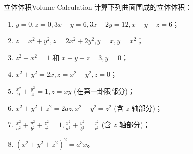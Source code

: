 \begin{problem}{立体体积}{Volume-Calculation}
    计算下列曲面围成的立体体积：
    \begin{enumerate}
        \item $y = 0, z = 0, 3x + y = 6, 3x + 2y = 12, x + y + z = 6$；
        \item $z = x^2 + y^2, z = 2x^2 + 2y^2, y = x, y = x^2$；
        \item $z^2 + x^2 = 1$ 和 $x + y + z = 3, y = 0$；
        \item $x^2 + y^2 = 2x, z = x^2 + y^2, z = 0$；
        \item $\frac{x^2}{9} + \frac{y^2}{4} = 1, z = xy$ (在第一卦限部分)；
        \item $x^2 + y^2 + z^2 = 2az, x^2 + y^2 = z^2$ (含 $z$ 轴部分)；
        \item $\frac{x^2}{a^2} + \frac{y^2}{b^2} + \frac{z^2}{c^2} = 1, \frac{x^2}{a^2} + \frac{y^2}{b^2} = \frac{z^2}{c^2}$ (含 $z$ 轴部分)；
        \item $(x^2 + y^2 + z^2)^2 = a^3 x$。
    \end{enumerate}
\end{problem}

